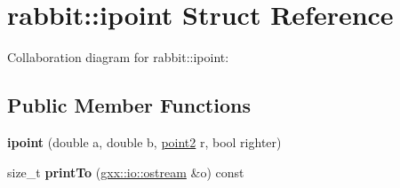 \hypertarget{structrabbit_1_1ipoint}{}\section{rabbit\+:\+:ipoint Struct Reference}
\label{structrabbit_1_1ipoint}


Collaboration diagram for rabbit\+:\+:ipoint\+:
\subsection*{Public Member Functions}
\begin{DoxyCompactItemize}
\item 
{\bfseries ipoint} (double a, double b, \hyperlink{classmalgo_1_1vector2}{point2} r, bool righter)\hypertarget{structrabbit_1_1ipoint_a685a073f94217eb0785b608687f3bddc}{}\label{structrabbit_1_1ipoint_a685a073f94217eb0785b608687f3bddc}

\item 
size\+\_\+t {\bfseries print\+To} (\hyperlink{classgxx_1_1io_1_1ostream}{gxx\+::io\+::ostream} \&o) const \hypertarget{structrabbit_1_1ipoint_a66f7873c8ce56ab891ab31595260d781}{}\label{structrabbit_1_1ipoint_a66f7873c8ce56ab891ab31595260d781}

\end{DoxyCompactItemize}
